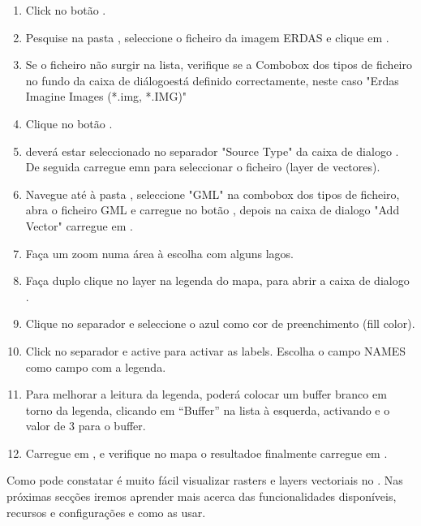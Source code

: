 {\setlength{\baselineskip}{1.3\baselineskip}
\begin{enumerate}[itemsep=2pt]
\item Click no botão .
\item Pesquise na pasta , seleccione
o ficheiro da imagem ERDAS  e clique em .
\item Se o ficheiro não surgir na lista, verifique se a Combobox dos tipos de ficheiro no
fundo da caixa de diálogoestá definido correctamente, neste caso "Erdas Imagine
Images (*.img, *.IMG)"
\item Clique no botão . 
\item {} deverá estar seleccionado no separador "Source Type"
da caixa de dialogo . De seguida carregue emn  para seleccionar o
ficheiro (layer de vectores).
\item Navegue até à pasta , seleccione "GML"
na combobox dos tipos de ficheiro, abra o ficheiro GML  
e carregue no botão , depois na caixa de dialogo "Add Vector" carregue em .
\item Faça um zoom numa área à escolha com alguns lagos.
\item Faça duplo clique no layer  na legenda do mapa, para abrir a 
caixa de dialogo .
\item Clique no separador  e seleccione o azul como cor de preenchimento (fill color).
\item Click no separador  e active  
para activar as labels. Escolha o campo NAMES como campo com a legenda.
\item Para melhorar a leitura da legenda, poderá colocar um buffer branco em torno da legenda,
clicando em ``Buffer'' na lista à esquerda, activando  e o valor de 3 para o buffer.
\item Carregue em , e verifique no mapa o resultadoe finalmente 
carregue em  .
\end{enumerate} 
\par}
Como pode constatar é muito fácil visualizar rasters e layers vectoriais no 
\qg. Nas próximas secções iremos aprender mais acerca 
das funcionalidades disponíveis, recursos e configurações e como as usar.

\FloatBarrier
